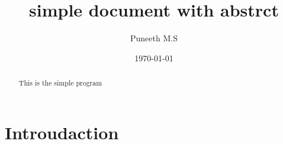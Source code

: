 \documentclass{article}
\begin{document}
\title{simple document with abstrct}
\author{Puneeth M.S}
\date{\today}
\maketitle
\begin{abstract}
    This is the simple program
\end{abstract}
\section{Introudaction}
\lipsum[1]
\end{document}
